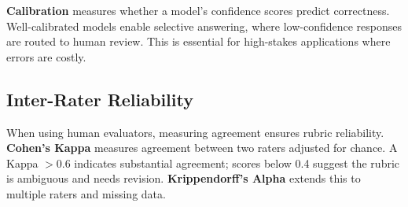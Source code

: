 \textbf{Calibration} measures whether a model's confidence scores predict correctness. Well-calibrated models enable selective answering, where low-confidence responses are routed to human review. This is essential for high-stakes applications where errors are costly.

\subsection{Inter-Rater Reliability}

When using human evaluators, measuring agreement ensures rubric reliability. \textbf{Cohen's Kappa} measures agreement between two raters adjusted for chance. A Kappa $> 0.6$ indicates substantial agreement; scores below 0.4 suggest the rubric is ambiguous and needs revision. \textbf{Krippendorff's Alpha} extends this to multiple raters and missing data.
